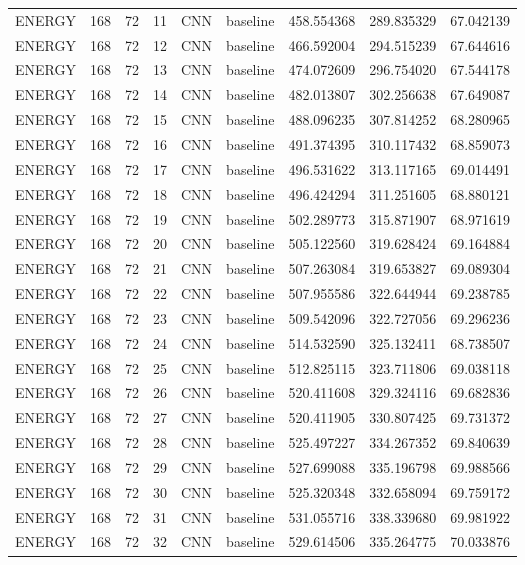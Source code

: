 \begin{table}
\begin{tabular}{lrrrllrrr}
ENERGY & 168 & 72 & 11 & CNN & baseline & 458.554368 & 289.835329 & 67.042139 \\
ENERGY & 168 & 72 & 12 & CNN & baseline & 466.592004 & 294.515239 & 67.644616 \\
ENERGY & 168 & 72 & 13 & CNN & baseline & 474.072609 & 296.754020 & 67.544178 \\
ENERGY & 168 & 72 & 14 & CNN & baseline & 482.013807 & 302.256638 & 67.649087 \\
ENERGY & 168 & 72 & 15 & CNN & baseline & 488.096235 & 307.814252 & 68.280965 \\
ENERGY & 168 & 72 & 16 & CNN & baseline & 491.374395 & 310.117432 & 68.859073 \\
ENERGY & 168 & 72 & 17 & CNN & baseline & 496.531622 & 313.117165 & 69.014491 \\
ENERGY & 168 & 72 & 18 & CNN & baseline & 496.424294 & 311.251605 & 68.880121 \\
ENERGY & 168 & 72 & 19 & CNN & baseline & 502.289773 & 315.871907 & 68.971619 \\
ENERGY & 168 & 72 & 20 & CNN & baseline & 505.122560 & 319.628424 & 69.164884 \\
ENERGY & 168 & 72 & 21 & CNN & baseline & 507.263084 & 319.653827 & 69.089304 \\
ENERGY & 168 & 72 & 22 & CNN & baseline & 507.955586 & 322.644944 & 69.238785 \\
ENERGY & 168 & 72 & 23 & CNN & baseline & 509.542096 & 322.727056 & 69.296236 \\
ENERGY & 168 & 72 & 24 & CNN & baseline & 514.532590 & 325.132411 & 68.738507 \\
ENERGY & 168 & 72 & 25 & CNN & baseline & 512.825115 & 323.711806 & 69.038118 \\
ENERGY & 168 & 72 & 26 & CNN & baseline & 520.411608 & 329.324116 & 69.682836 \\
ENERGY & 168 & 72 & 27 & CNN & baseline & 520.411905 & 330.807425 & 69.731372 \\
ENERGY & 168 & 72 & 28 & CNN & baseline & 525.497227 & 334.267352 & 69.840639 \\
ENERGY & 168 & 72 & 29 & CNN & baseline & 527.699088 & 335.196798 & 69.988566 \\
ENERGY & 168 & 72 & 30 & CNN & baseline & 525.320348 & 332.658094 & 69.759172 \\
ENERGY & 168 & 72 & 31 & CNN & baseline & 531.055716 & 338.339680 & 69.981922 \\
ENERGY & 168 & 72 & 32 & CNN & baseline & 529.614506 & 335.264775 & 70.033876 \\

\end{tabular}
\end{table}
